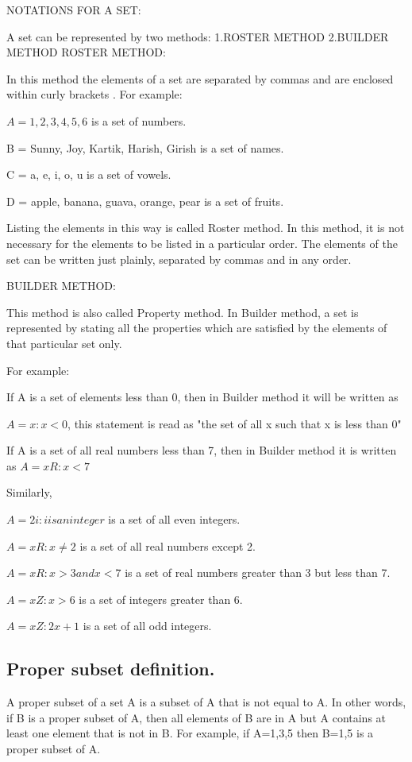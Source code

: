 \documentclass[]{report}
\begin{document}
\newpage


NOTATIONS FOR A SET:

A set can be represented by two methods:
1.ROSTER METHOD
2.BUILDER METHOD
ROSTER METHOD:

In this method the elements of a set are separated by commas and are enclosed within curly brackets { }. For example:

$A = {1, 2, 3, 4, 5, 6}$ is a set of numbers.

B = {Sunny, Joy, Kartik, Harish, Girish} is a set of names.

C = {a, e, i, o, u} is a set of vowels.

D = {apple, banana, guava, orange, pear} is a set of fruits.

Listing the elements in this way is called Roster method. In this method, it is not necessary for the elements to be listed in a particular order. The elements of the set can be written just plainly, separated by commas and in any order.


BUILDER METHOD:

This method is also called Property method. In Builder method, a set is represented by stating all the properties which are satisfied by the elements of that particular set only.

For example:

If A is a set of elements less than 0, then in Builder method it will be written as

$A = {x: x < 0}$, this statement is read as "the set of all x such that x is less than 0"

If A is a set of all real numbers less than 7, then in Builder method it is written as $A = {x   R: x < 7}$

Similarly,

$A = {2i: i is an integer}$ is a set of all even integers.

$A = {x   R: x \neq 2}$ is a set of all real numbers except 2.

$A = {x   R: x > 3 and x < 7}$ is a set of real numbers greater than 3 but less than 7.

$A = {x   Z: x > 6}$ is a set of integers greater than 6.

$A = {x   Z: 2x + 1}$ is a set of all odd integers.


\subsection{Proper subset definition.} 
A proper subset of a set A is a subset of A that is not equal to A. In other words, if B is a proper subset of A, then all elements of B are in A but A contains at least one element that is not in B. For example, if A={1,3,5} then B={1,5} is a proper subset of A.
\end{document}
